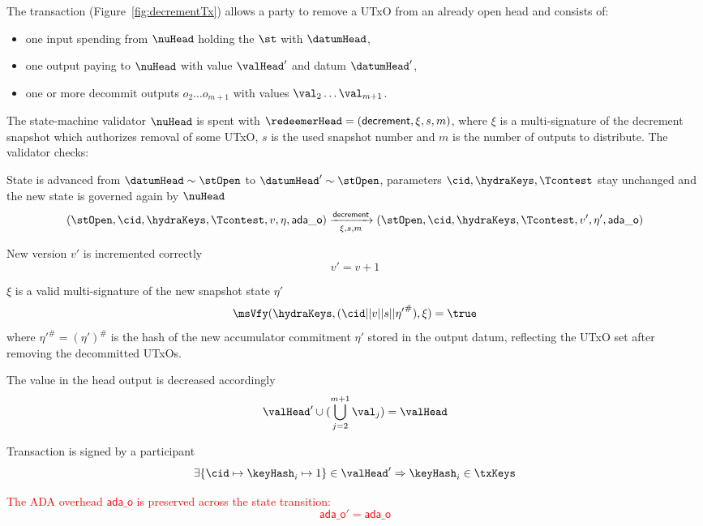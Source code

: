\noindent The \mtxDecrement{} transaction (Figure~\ref{fig:decrementTx}) allows
a party to remove a UTxO from an already open head and consists of:

\begin{itemize}
	\item one input spending from $\nuHead$ holding the $\st$ with $\datumHead$,
	\item one output paying to $\nuHead$ with value $\valHead'$ and
	      datum $\datumHead'$,
	\item one or more decommit outputs $o_{2} \dots o_{m+1}$ with values $\val_{2} \dots \val_{m+1} $.
\end{itemize}

\noindent The state-machine validator $\nuHead$ is spent with
$\redeemerHead = (\mathsf{decrement}, \xi, s, m)$, where $\xi$ is a multi-signature of
the decrement snapshot which authorizes removal of some UTxO, $s$ is the
used snapshot number and $m$ is the number of outputs to distribute. The
validator checks:
\begin{menumerate}
	\item State is advanced from $\datumHead \sim \stOpen$ to
	$\datumHead' \sim \stOpen$, parameters $\cid,\hydraKeys,\Tcontest$ stay
	unchanged and the new state is governed again by $\nuHead$
	\[
		(\stOpen,\cid,\hydraKeys,\Tcontest,v,\eta,\mathsf{ada\_o}) \xrightarrow[\xi, s, m]{\mathsf{decrement}} (\stOpen,\cid,\hydraKeys,\Tcontest,v',\eta',\mathsf{ada\_o})
	\]
	\item New version $v'$ is incremented correctly
	\[
		v' = v + 1
	\]
	\item $\xi$ is a valid multi-signature of the new snapshot state $\eta'$
	\[
		\msVfy(\hydraKeys,(\cid || v || s || {\eta'}^{\#}),\xi) = \true
	\]
	where ${\eta'}^{\#} = (\eta')^{\#}$ is the hash of the new accumulator commitment $\eta'$
	stored in the output datum, reflecting the UTxO set after removing the decommitted UTxOs.
	\item The value in the head output is decreased accordingly
	\[
		\valHead' \cup (\bigcup_{j=2}^{m+1} \val_{j}) = \valHead
	\]
	\item Transaction is signed by a participant
	\[
		\exists \{\cid \mapsto \keyHash_{i} \mapsto 1\} \in \valHead' \Rightarrow \keyHash_{i} \in \txKeys
	\]
	\item \textcolor{red}{The ADA overhead $\mathsf{ada\_o}$ is preserved across the state transition:
	\[
		\mathsf{ada\_o}' = \mathsf{ada\_o}
	\]}
\end{menumerate}

